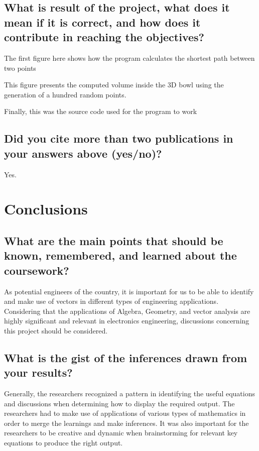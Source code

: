 \subsection{What is result of the project, what does it mean if it is correct, and how does it contribute in reaching the objectives?}
The first figure here shows how the program calculates the shortest path between two points

This figure presents the computed volume inside the 3D bowl using the generation of a hundred random points.

Finally, this was the source code used for the program to work


\subsection{Did you cite more than two publications in your answers above (yes/no)?}
Yes.	


\section{Conclusions}
\label{sec:conc}

\subsection{What are the main points that should be known, remembered, and learned about the coursework?}
As potential engineers of the country, it is important for us to be able to identify and make use of vectors in different types of engineering applications. Considering that the applications of Algebra, Geometry, and vector analysis are highly significant and relevant in electronics engineering, discussions concerning this project should be considered.


\subsection{What is the gist of the inferences drawn from your results?}
Generally, the researchers recognized a pattern in identifying the useful equations and discussions when determining how to display the required output. The researchers had to make use of applications of various types of mathematics in order to merge the learnings and make inferences. It was also important for the researchers to be creative and dynamic when brainstorming for relevant key equations to produce the right output.


